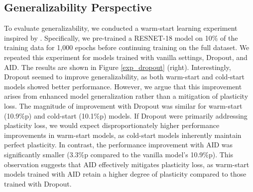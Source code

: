 \subsection{Generalizability Perspective}

To evaluate generalizability, we conducted a warm-start learning experiment inspired by \citet{lee2024slow}.
Specifically, we pre-trained a RESNET-18 model on 10\% of the training data for 1,000 epochs before continuing training on the full dataset.
We repeated this experiment for models trained with vanilla settings, Dropout, and AID.
The results are shown in Figure \ref{exp_dropout} (right).
Interestingly, Dropout seemed to improve generalizability, as both warm-start and cold-start models showed better performance.
However, we argue that this improvement arises from enhanced model generalization rather than a mitigation of plasticity loss.
The magnitude of improvement with Dropout was similar for warm-start (10.9\%p) and cold-start (10.1\%p) models.
If Dropout were primarily addressing plasticity loss, we would expect disproportionately higher performance improvements in warm-start models, as cold-start models inherently maintain perfect plasticity.
In contrast, the performance improvement with AID was significantly smaller (3.3\%p compared to the vanilla model's 10.9\%p).
This observation suggests that AID effectively mitigates plasticity loss, as warm-start models trained with AID retain a higher degree of plasticity compared to those trained with Dropout.

